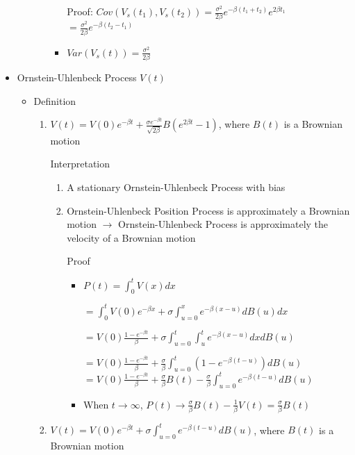 \documentclass[a4paper]{article}
\begin{document}
\begin{itemize}
\begin{itemize}
\begin{itemize}
\begin{itemize}
                                Proof: $\mathit{Cov}(V_s(t_1), V_s(t_2)) = \frac{\sigma^2}{2\beta} e^{-\beta(t_1 + t_2)} e^{2\beta t_1}$
                                $= \frac{\sigma^2}{2\beta} e^{-\beta(t_2 - t_1)}$
                            \item $\mathit{Var}(V_s(t)) = \frac{\sigma^2}{2\beta}$
                        \end{itemize}
                \end{itemize}
        \end{itemize}
    \item Ornstein-Uhlenbeck Process $V(t)$
        \begin{itemize}
            \item Definition
                \begin{enumerate}
                    \item $V(t) = V(0) e^{-\beta t} + \frac{\sigma e^{-\beta t}}{\sqrt{2\beta }} B(e^{2\beta t} - 1)$, where $B(t)$ is a Brownian motion

                        Interpretation
                        \begin{enumerate}
                            \item A stationary Ornstein-Uhlenbeck Process with bias
                            \item Ornstein-Uhlenbeck Position Process is approximately a Brownian motion $\rightarrow$ Ornstein-Uhlenbeck Process is approximately the velocity of a Brownian motion

                                Proof
                                \begin{itemize}
                                    \item $P(t) = \int_0^t V(x) dx$

                                        $= \int_0^t V(0) e^{-\beta x} + \sigma \int_{u=0}^x e^{-\beta (x-u)} d B(u) dx$

                                        $= V(0) \frac{1 - e^{-\beta t}}{\beta} + \sigma \int_{u=0}^t \int_u^t e^{-\beta (x-u)} d x d B(u)$

                                        $= V(0) \frac{1 - e^{-\beta t}}{\beta} + \frac{\sigma}{\beta} \int_{u=0}^t (1 - e^{-\beta (t-u)}) d B(u)$
                                        $= V(0) \frac{1 - e^{-\beta t}}{\beta} + \frac{\sigma}{\beta} B(t) - \frac{\sigma}{\beta} \int_{u=0}^t e^{-\beta (t-u)} d B(u)$
                                    \item When $t \rightarrow \infty$, $P(t) \rightarrow \frac{\sigma}{\beta} B(t) - \frac{1}{\beta}V(t) = \frac{\sigma}{\beta} B(t)$
                                \end{itemize}
                        \end{enumerate}
                    \item $V(t) = V(0) e^{-\beta t} + \sigma \int_{u=0}^t e^{-\beta (t-u)} d B(u)$, where $B(t)$ is a Brownian motion


\end{enumerate}
\end{itemize}
\end{itemize}
\end{document}

